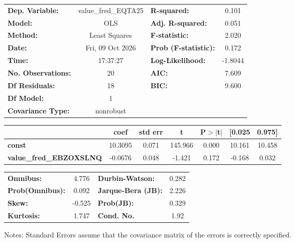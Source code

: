 \begin{center}
\begin{tabular}{lclc}
\toprule
\textbf{Dep. Variable:}         & value\_fred\_EQTA25 & \textbf{  R-squared:         } &     0.101   \\
\textbf{Model:}                 &         OLS         & \textbf{  Adj. R-squared:    } &     0.051   \\
\textbf{Method:}                &    Least Squares    & \textbf{  F-statistic:       } &     2.020   \\
\textbf{Date:}                  &   Fri, 09 Oct 2026  & \textbf{  Prob (F-statistic):} &    0.172    \\
\textbf{Time:}                  &       17:37:27      & \textbf{  Log-Likelihood:    } &   -1.8044   \\
\textbf{No. Observations:}      &            20       & \textbf{  AIC:               } &     7.609   \\
\textbf{Df Residuals:}          &            18       & \textbf{  BIC:               } &     9.600   \\
\textbf{Df Model:}              &             1       & \textbf{                     } &             \\
\textbf{Covariance Type:}       &      nonrobust      & \textbf{                     } &             \\
\bottomrule
\end{tabular}
\begin{tabular}{lcccccc}
                                & \textbf{coef} & \textbf{std err} & \textbf{t} & \textbf{P$> |$t$|$} & \textbf{[0.025} & \textbf{0.975]}  \\
\midrule
\textbf{const}                  &      10.3095  &        0.071     &   145.966  &         0.000        &       10.161    &       10.458     \\
\textbf{value\_fred\_EBZOXSLNQ} &      -0.0676  &        0.048     &    -1.421  &         0.172        &       -0.168    &        0.032     \\
\bottomrule
\end{tabular}
\begin{tabular}{lclc}
\textbf{Omnibus:}       &  4.776 & \textbf{  Durbin-Watson:     } &    0.282  \\
\textbf{Prob(Omnibus):} &  0.092 & \textbf{  Jarque-Bera (JB):  } &    2.226  \\
\textbf{Skew:}          & -0.525 & \textbf{  Prob(JB):          } &    0.329  \\
\textbf{Kurtosis:}      &  1.747 & \textbf{  Cond. No.          } &     1.92  \\
\bottomrule
\end{tabular}
\end{center}

Notes: \newline
 [1] Standard Errors assume that the covariance matrix of the errors is correctly specified.